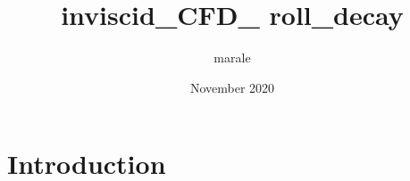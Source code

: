 \documentclass{article}
\title{inviscid_CFD_ roll_decay}
\author{marale }
\date{November 2020}
\begin{document}
\maketitle

\section{Introduction}
\end{document}
